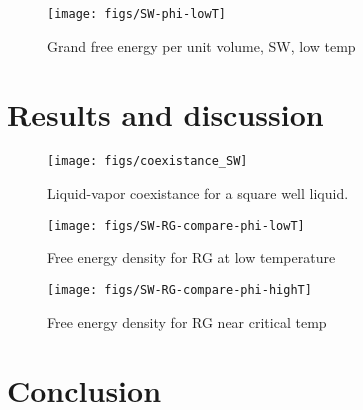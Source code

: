 \documentclass[letterpaper,twocolumn,amsmath,amssymb,prb]{revtex4-1}
\begin{document}
\begin{figure}
  \centering
  \texttt{[image: figs/SW-phi-lowT]}
  \caption{Grand free energy per unit volume, SW, low temp}
  \label{fig:SW-phi-lowT}
\end{figure}

\section{Results and discussion}

\begin{figure}
  \begin{center}
  \texttt{[image: figs/coexistance\_SW]}
  \end{center}
  \caption{Liquid-vapor coexistance for a square well liquid.}
  \label{fig:coexistance_SW}
\end{figure}

\begin{figure}
  \begin{center}
  \texttt{[image: figs/SW-RG-compare-phi-lowT]}
  \end{center}
  \caption{Free energy density for RG at low temperature}
  \label{fig:SW-RG-compare-lowT}
\end{figure}

\begin{figure}
  \begin{center}
  \texttt{[image: figs/SW-RG-compare-phi-highT]}
  \end{center}
  \caption{Free energy density for RG near critical temp}
  \label{fig:SW-RG-compare-highT}
\end{figure}



\section{Conclusion}



\end{document}
